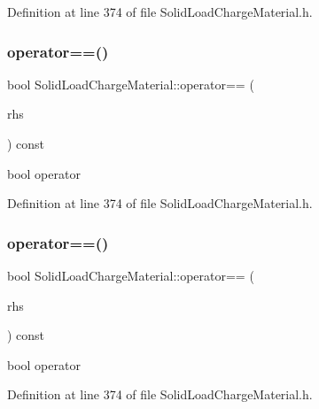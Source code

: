 Definition at line 374 of file Solid\+Load\+Charge\+Material.\+h.

\mbox{\label{class_solid_load_charge_material_aacf2f41ce38067a52fb7d8456a05a699}} 
\subsubsection{\texorpdfstring{operator==()}{operator==()}\hspace{0.1cm}{\footnotesize\ttfamily [2/3]}}
{\footnotesize\ttfamily bool Solid\+Load\+Charge\+Material\+::operator== (\begin{DoxyParamCaption}\item[{const \hyperlink{class_solid_load_charge_material}{Solid\+Load\+Charge\+Material} \&}]{rhs }\end{DoxyParamCaption}) const\hspace{0.3cm}{\ttfamily [inline]}}

bool operator 

Definition at line 374 of file Solid\+Load\+Charge\+Material.\+h.

\mbox{\label{class_solid_load_charge_material_aacf2f41ce38067a52fb7d8456a05a699}} 
\subsubsection{\texorpdfstring{operator==()}{operator==()}\hspace{0.1cm}{\footnotesize\ttfamily [3/3]}}
{\footnotesize\ttfamily bool Solid\+Load\+Charge\+Material\+::operator== (\begin{DoxyParamCaption}\item[{const \hyperlink{class_solid_load_charge_material}{Solid\+Load\+Charge\+Material} \&}]{rhs }\end{DoxyParamCaption}) const\hspace{0.3cm}{\ttfamily [inline]}}

bool operator 

Definition at line 374 of file Solid\+Load\+Charge\+Material.\+h.

